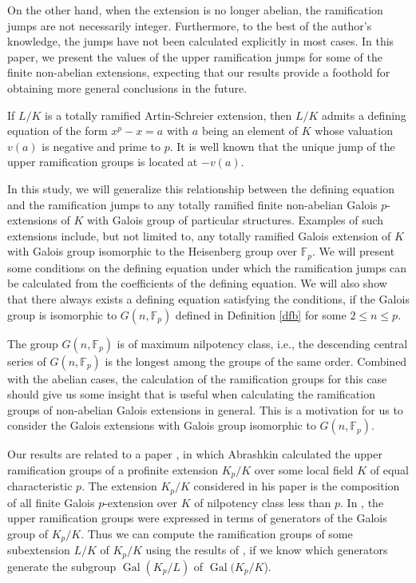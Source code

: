 \documentclass[sn-mathphys-num]{sn-jnl}
\numberwithin{equation}{section}
\newcommand{\Gal}{\operatorname{Gal}}
\theoremstyle{plain}
\theoremstyle{definition}
\begin{document}
On the other hand, when the extension is no longer abelian, the ramification jumps are not necessarily integer. Furthermore, to the best of the author's knowledge, the jumps have not been calculated explicitly in most cases. In this paper, we present the values of the upper ramification jumps for some of the finite non-abelian extensions, expecting that our results provide a foothold for obtaining more general conclusions in the future.

If $L/K$ is a totally ramified Artin-Schreier extension, then $L/K$ admits a defining equation of the form $x^p-x=a$ with $a$ being an element of $K$ whose valuation $v(a)$ is negative and prime to $p$. It is well known that the unique jump of the upper ramification groups is located at $-v(a)$.

In this study, we will generalize this relationship between the defining equation and the ramification jumps to any totally ramified finite non-abelian Galois $p$-extensions of $K$ with Galois group of particular structures. Examples of such extensions include, but not limited to, any totally ramified Galois extension of $K$ with Galois group isomorphic to the Heisenberg group over $\mathbb{F}_p$. We will present some conditions on the defining equation under which the ramification jumps can be calculated from the coefficients of the defining equation. We will also show that there always exists a defining equation satisfying the conditions, if the Galois group is isomorphic to $G(n,\mathbb{F}_p)$ defined in Definition \ref{dfb} for some $2\leq n\leq p$.










The group $G(n,\mathbb{F}_p)$ is of maximum nilpotency class, i.e., the descending central series of $G(n,\mathbb{F}_p)$ is the longest among the groups of the same order. Combined with the abelian cases, the calculation of the ramification groups for this case should give us some insight that is useful when calculating the ramification groups of non-abelian Galois extensions in general. This is a motivation for us to consider the Galois extensions with Galois group isomorphic to $G(n,\mathbb{F}_p)$.

Our results are related to a paper \cite{Ab}, in which Abrashkin calculated the upper ramification groups of a profinite extension $K_p/K$ over some local field $K$ of equal characteristic $p$. The extension $K_p/K$ considered in his paper is the composition of all finite Galois $p$-extension over $K$ of nilpotency class less than $p$. In \cite{Ab}, the upper ramification groups were expressed in terms of generators of the Galois group of $K_p/K$. Thus we can compute the ramification groups of some subextension $L/K$ of $K_p/K$ using the results of \cite{Ab}, if we know which generators generate the subgroup $\Gal(K_p/L)$ of $\Gal(K_p/K$).
\end{document}
